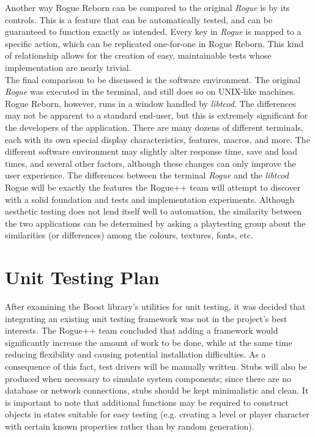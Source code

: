 \documentclass[12pt, titlepage]{article}
\newcommand{\rev}[1]{\textcolor{RevisionColour}{#1}}
\begin{document}
	Another way Rogue Reborn can be compared to the original \textit{Rogue} is by its controls.  This is a feature that can be automatically tested, and can be guaranteed to function exactly as intended.  Every key in \textit{Rogue} is mapped to a specific action, which can be replicated one-for-one in Rogue Reborn.  This kind of relationship allows for the creation of easy, maintainable tests whose implementation are nearly trivial.\\

	The final comparison to be discussed is the software environment.  The original \textit{Rogue} was executed in the terminal, and still does so on UNIX-like machines.  Rogue Reborn, however, runs in a window handled by \textit{libtcod}.  The differences may not be apparent to a standard end-user, but this is extremely significant for the developers of the application.  There are many dozens of different terminals, each with its own special display characteristics, features, macros, and  more.  The different software environment may slightly alter response time, save and load times, and several other factors, although these changes can only improve the user experience.  The differences between the terminal \textit{Rogue} and the \textit{libtcod} Rogue will be exactly the features the Rogue++ team will attempt to discover with a solid foundation and tests and implementation experiments.  \rev{Although aesthetic testing does not lend itself well to automation, the similarity between the two applications can be determined by asking a playtesting group about the similarities (or differences) among the colours, textures, fonts, etc.}\\
	
	
\newpage
\section{Unit Testing Plan}
\label{section6}
	
	After examining the Boost library's utilities for unit testing, it was decided that integrating an existing unit testing framework was not in the project's best interests.  The Rogue++ team concluded that adding a framework would significantly \rev{increase} the amount of work to be done, while at the same time reducing flexibility and causing potential installation difficulties.  As a consequence of this fact, test drivers will be manually written.  Stubs will also be produced when necessary to simulate system components; since there are no database or network connections, stubs should be kept minimalistic and clean.  It is important to note that additional functions may be required to construct objects in states suitable for easy testing (e.g. creating a level or player character with certain known properties rather than by random generation).
	
\end{document}
